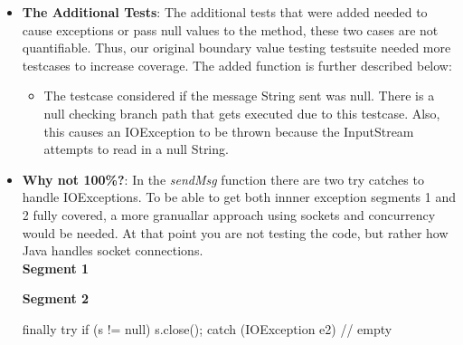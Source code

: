 \documentclass[fontsize=12pt,paper=letter,twoside]{scrartcl}
\begin{document}
\begin{itemize}
\item \textbf{The Additional Tests}: The additional tests that were added needed to cause exceptions or pass null values to the method, these two cases are not quantifiable. Thus, our original boundary value testing testsuite needed more testcases to increase coverage. The added function is further described below:
\begin{itemize}
\item The testcase considered if the message String sent was null. There is a null checking branch path that gets executed due to this testcase. Also, this causes an IOException to be thrown because the InputStream attempts to read in a null String.
\end{itemize}
\item \textbf{Why not 100\%?}: In the \emph{sendMsg} function there are two try catches to handle IOExceptions. To be able to get both innner exception segments 1 and 2 fully covered, a more granuallar approach using sockets and concurrency would be needed. At that point you are not testing the code, but rather how Java handles socket connections.
\\
\textbf{Segment 1}
    \begin{code}
    } catch (IOException e) {
            if (s != null)
                s.close();
            throw e;
    }
    \end{code} 
\textbf{Segment 2}
    \begin{code}
    finally {
            try {
                if (s != null)
                    s.close();
            } catch (IOException e2) {
                // empty
            }
        }
    \end{code} 

\end{itemize}
\end{document}

